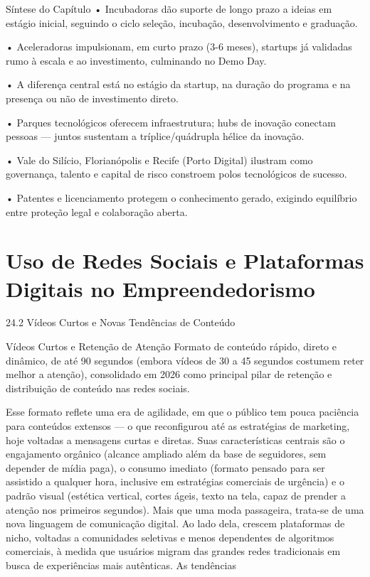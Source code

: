 Síntese do Capítulo • Incubadoras dão suporte de longo prazo a ideias em estágio inicial, seguindo o ciclo seleção, incubação, desenvolvimento e graduação.

• Aceleradoras impulsionam, em curto prazo (3-6 meses), startups já validadas rumo à escala e ao investimento, culminando no Demo Day.

• A diferença central está no estágio da startup, na duração do programa e na presença ou não de investimento direto.

• Parques tecnológicos oferecem infraestrutura; hubs de inovação conectam pessoas — juntos sustentam a tríplice/quádrupla hélice da inovação.

• Vale do Silício, Florianópolis e Recife (Porto Digital) ilustram como governança, talento e capital de risco constroem polos tecnológicos de sucesso.

• Patentes e licenciamento protegem o conhecimento gerado, exigindo equilíbrio entre proteção legal e colaboração aberta.

\chapter{Uso de Redes Sociais e Plataformas Digitais no Empreendedorismo}

24.2 Vídeos Curtos e Novas Tendências de Conteúdo

Vídeos Curtos e Retenção de Atenção Formato de conteúdo rápido, direto e dinâmico, de até 90 segundos (embora vídeos de 30 a 45 segundos costumem reter melhor a atenção), consolidado em 2026 como principal pilar de retenção e distribuição de conteúdo nas redes sociais.

Esse formato reflete uma era de agilidade, em que o público tem pouca paciência para conteúdos extensos — o que reconfigurou até as estratégias de marketing, hoje voltadas a mensagens curtas e diretas. Suas características centrais são o engajamento orgânico (alcance ampliado além da base de seguidores, sem depender de mídia paga), o consumo imediato (formato pensado para ser assistido a qualquer hora, inclusive em estratégias comerciais de urgência) e o padrão visual (estética vertical, cortes ágeis, texto na tela, capaz de prender a atenção nos primeiros segundos). Mais que uma moda passageira, trata-se de uma nova linguagem de comunicação digital. Ao lado dela, crescem plataformas de nicho, voltadas a comunidades seletivas e menos dependentes de algoritmos comerciais, à medida que usuários migram das grandes redes tradicionais em busca de experiências mais autênticas. As tendências


